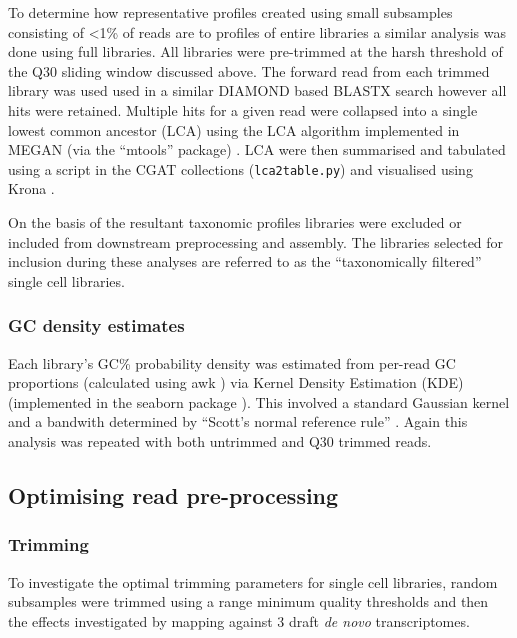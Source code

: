 To determine how representative profiles created using small subsamples 
consisting of <1\% of reads are to profiles of entire libraries a similar analysis
was done using full libraries. All libraries were pre-trimmed at the harsh
threshold of the Q30 sliding window discussed above. 
The forward read from each trimmed library was used 
used in a similar DIAMOND based BLASTX search however all hits were retained.
Multiple hits for a given read were collapsed 
into a single lowest common ancestor (LCA) using the LCA algorithm \citep{Gabow1985} implemented in MEGAN (via the ``mtools''
package) \citep{Huson2007,el2013improved}.  LCA were then summarised and tabulated using
a script in the CGAT collections (\texttt{lca2table.py}) \citep{Sims2014} and visualised 
using Krona \citep{Ondov2011}.

On the basis of the resultant taxonomic profiles libraries were excluded or included
from downstream preprocessing and assembly. The libraries selected for inclusion during these analyses 
are referred to as the ``taxonomically filtered'' single cell libraries.

\subsubsection{GC density estimates}

Each library's GC\% probability density was estimated from per-read GC proportions
(calculated using awk \citep{Aho1987}) via Kernel Density Estimation (KDE) \citep{Rosenblatt1956,Parzen1962} 
(implemented in the seaborn package \citep{michael_waskom_2015_19108}).
This involved a standard Gaussian kernel and a bandwith determined by ``Scott's normal reference rule'' \citep{Scott1979}.  
Again this analysis was repeated with both untrimmed and Q30 trimmed reads. 

\subsection{Optimising read pre-processing}

\subsubsection{Trimming}

To investigate the optimal trimming parameters for single cell libraries, 
random subsamples were trimmed using a range minimum quality thresholds and then the effects investigated
by mapping against 3 draft \textit{de novo} transcriptomes.

